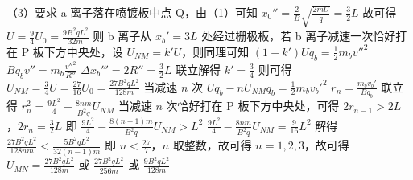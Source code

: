 \documentclass[\gkver]{gaokaozhenti}
\begin{document}
\begin{enumerate}
{（3）要求 a 离子落在喷镀板中点 Q，由（1）可知 $x_{0}'' = \frac{2}{B}\sqrt{\frac{2mU}{q}} = \frac{3}{2}L$
故可得 $U = \frac{9}{4}U_{0} = \frac{9B^{2}qL^{2}}{32m}$
则 b 离子从 $x_{b}' = 3L$ 处经过栅极板，若 b 离子减速一次恰好打在 P 板下方中央处，设 $U_{NM} = k'U$，则同理可知
$(1 - k')Uq_{b} = \frac{1}{2}m_{b}v''^{2}$
$Bq_{b}v'' = m_{b}\frac{v''^{2}}{R''}$
$\Delta x_{b}''' = 2R'' = \frac{3}{2}L$
联立解得 $k' = \frac{3}{4}$
则可得 $U_{NM} = \frac{3}{4}U = \frac{27}{16}U_{0} = \frac{27B^{2}qL^{2}}{128m}$
当减速 $n$ 次
$Uq_{b} - nU_{NM}q_{b} = \frac{1}{2}m_{b}v_{b}'^{2}$
$r_{n} = \frac{m_{b}v_{b}'}{Bq_{b}}$
联立得 $r_{n}^{2} = \frac{9L^{2}}{4} - \frac{8nm}{B^{2}q}U_{NM}$
当减速 $n$ 次恰好打在 P 板下方中央处，可得 $2r_{n-1} > 2L$，$2r_{n} = \frac{3}{2}L$
即 $\frac{9L^{2}}{4} - \frac{8(n - 1)m}{B^{2}q}U_{NM} > L^{2}$
$\frac{9L^{2}}{4} - \frac{8nm}{B^{2}q}U_{NM} = \frac{9}{16}L^{2}$
解得 $\frac{27B^{2}qL^{2}}{128nm} < \frac{5B^{2}qL^{2}}{32(n - 1)m}$
即 $n < \frac{27}{7}$，$n$ 取整数，故可得 $n = 1,2,3$，故可得
$U_{MN} = \frac{27B^{2}qL^{2}}{128m}$ 或 $\frac{27B^{2}qL^{2}}{256m}$ 或 $\frac{9B^{2}qL^{2}}{128m}$
}

\end{enumerate}
\end{document}
